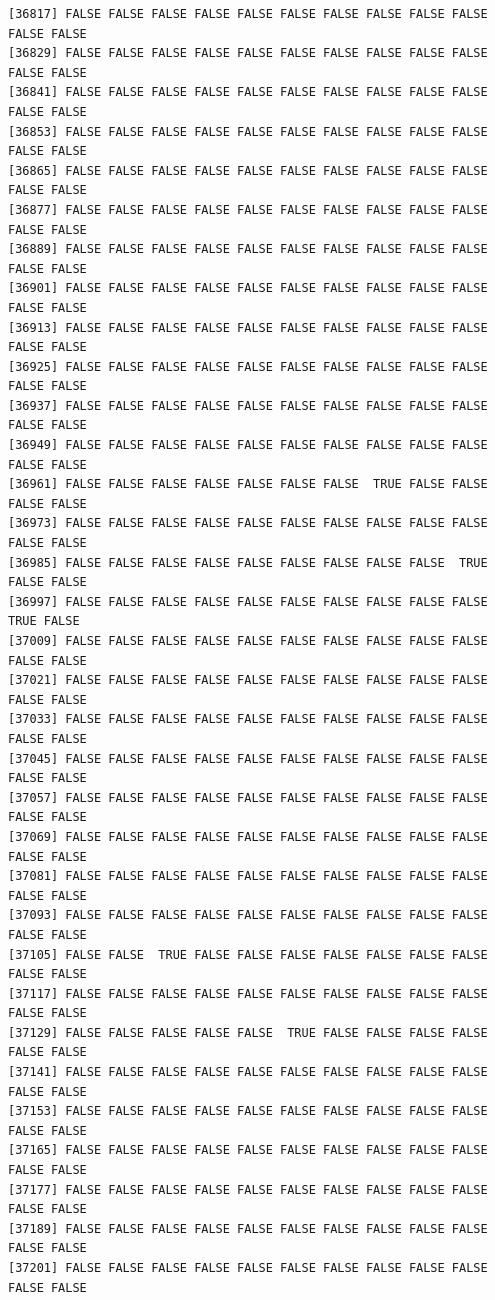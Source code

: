 \documentclass[
  a4paper,
  DIV=11,
  numbers=noendperiod]{scrartcl}
\begin{document}
\begin{verbatim}
[36817] FALSE FALSE FALSE FALSE FALSE FALSE FALSE FALSE FALSE FALSE FALSE FALSE
[36829] FALSE FALSE FALSE FALSE FALSE FALSE FALSE FALSE FALSE FALSE FALSE FALSE
[36841] FALSE FALSE FALSE FALSE FALSE FALSE FALSE FALSE FALSE FALSE FALSE FALSE
[36853] FALSE FALSE FALSE FALSE FALSE FALSE FALSE FALSE FALSE FALSE FALSE FALSE
[36865] FALSE FALSE FALSE FALSE FALSE FALSE FALSE FALSE FALSE FALSE FALSE FALSE
[36877] FALSE FALSE FALSE FALSE FALSE FALSE FALSE FALSE FALSE FALSE FALSE FALSE
[36889] FALSE FALSE FALSE FALSE FALSE FALSE FALSE FALSE FALSE FALSE FALSE FALSE
[36901] FALSE FALSE FALSE FALSE FALSE FALSE FALSE FALSE FALSE FALSE FALSE FALSE
[36913] FALSE FALSE FALSE FALSE FALSE FALSE FALSE FALSE FALSE FALSE FALSE FALSE
[36925] FALSE FALSE FALSE FALSE FALSE FALSE FALSE FALSE FALSE FALSE FALSE FALSE
[36937] FALSE FALSE FALSE FALSE FALSE FALSE FALSE FALSE FALSE FALSE FALSE FALSE
[36949] FALSE FALSE FALSE FALSE FALSE FALSE FALSE FALSE FALSE FALSE FALSE FALSE
[36961] FALSE FALSE FALSE FALSE FALSE FALSE FALSE  TRUE FALSE FALSE FALSE FALSE
[36973] FALSE FALSE FALSE FALSE FALSE FALSE FALSE FALSE FALSE FALSE FALSE FALSE
[36985] FALSE FALSE FALSE FALSE FALSE FALSE FALSE FALSE FALSE  TRUE FALSE FALSE
[36997] FALSE FALSE FALSE FALSE FALSE FALSE FALSE FALSE FALSE FALSE  TRUE FALSE
[37009] FALSE FALSE FALSE FALSE FALSE FALSE FALSE FALSE FALSE FALSE FALSE FALSE
[37021] FALSE FALSE FALSE FALSE FALSE FALSE FALSE FALSE FALSE FALSE FALSE FALSE
[37033] FALSE FALSE FALSE FALSE FALSE FALSE FALSE FALSE FALSE FALSE FALSE FALSE
[37045] FALSE FALSE FALSE FALSE FALSE FALSE FALSE FALSE FALSE FALSE FALSE FALSE
[37057] FALSE FALSE FALSE FALSE FALSE FALSE FALSE FALSE FALSE FALSE FALSE FALSE
[37069] FALSE FALSE FALSE FALSE FALSE FALSE FALSE FALSE FALSE FALSE FALSE FALSE
[37081] FALSE FALSE FALSE FALSE FALSE FALSE FALSE FALSE FALSE FALSE FALSE FALSE
[37093] FALSE FALSE FALSE FALSE FALSE FALSE FALSE FALSE FALSE FALSE FALSE FALSE
[37105] FALSE FALSE  TRUE FALSE FALSE FALSE FALSE FALSE FALSE FALSE FALSE FALSE
[37117] FALSE FALSE FALSE FALSE FALSE FALSE FALSE FALSE FALSE FALSE FALSE FALSE
[37129] FALSE FALSE FALSE FALSE FALSE  TRUE FALSE FALSE FALSE FALSE FALSE FALSE
[37141] FALSE FALSE FALSE FALSE FALSE FALSE FALSE FALSE FALSE FALSE FALSE FALSE
[37153] FALSE FALSE FALSE FALSE FALSE FALSE FALSE FALSE FALSE FALSE FALSE FALSE
[37165] FALSE FALSE FALSE FALSE FALSE FALSE FALSE FALSE FALSE FALSE FALSE FALSE
[37177] FALSE FALSE FALSE FALSE FALSE FALSE FALSE FALSE FALSE FALSE FALSE FALSE
[37189] FALSE FALSE FALSE FALSE FALSE FALSE FALSE FALSE FALSE FALSE FALSE FALSE
[37201] FALSE FALSE FALSE FALSE FALSE FALSE FALSE FALSE FALSE FALSE FALSE FALSE

\end{verbatim}
\end{document}
